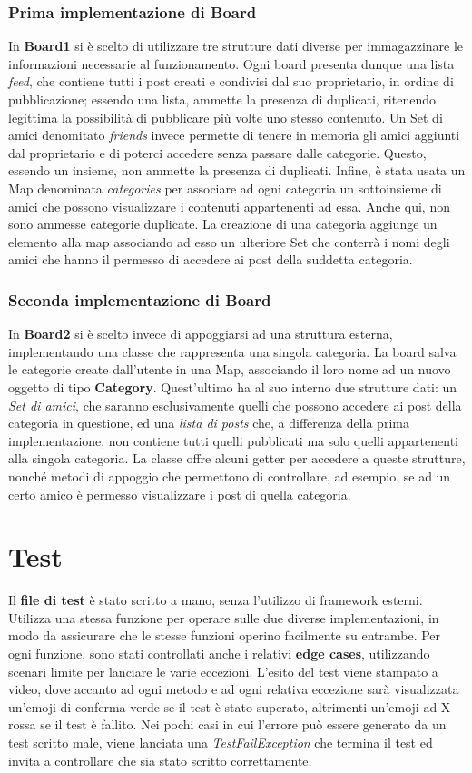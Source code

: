\documentclass[10pt, italian, openany]{book}
\begin{document}
\subsubsection{Prima implementazione di Board}
In \textbf{Board1} si è scelto di utilizzare tre strutture dati diverse per immagazzinare le informazioni necessarie al funzionamento.
Ogni board presenta dunque una lista \textit{feed}, che contiene tutti i post creati e condivisi dal suo proprietario, in ordine di pubblicazione; essendo una lista, ammette la presenza di duplicati, ritenendo legittima la possibilità di pubblicare più volte uno stesso contenuto. Un Set di amici denomitato \textit{friends} invece permette di tenere in memoria gli amici aggiunti dal proprietario e di poterci accedere senza passare dalle categorie. Questo, essendo un insieme, non ammette la presenza di duplicati. Infine, è stata usata un Map denominata \textit{categories} per associare ad ogni categoria un sottoinsieme di amici che possono visualizzare i contenuti appartenenti ad essa. Anche qui, non sono ammesse categorie duplicate. La creazione di una categoria aggiunge un elemento alla map associando ad esso un ulteriore Set che conterrà i nomi degli amici che hanno il permesso di accedere ai post della suddetta categoria.

\subsubsection{Seconda implementazione di Board}
In \textbf{Board2} si è scelto invece di appoggiarsi ad una struttura esterna, implementando una classe che rappresenta una singola categoria. La board salva le categorie create dall'utente in una Map, associando il loro nome ad un nuovo oggetto di tipo \textbf{Category}. Quest'ultimo ha al suo interno due strutture dati: un \textit{Set di amici}, che saranno esclusivamente quelli che possono accedere ai post della categoria in questione, ed una \textit{lista di posts} che, a differenza della prima implementazione, non contiene tutti quelli pubblicati ma solo quelli appartenenti alla singola categoria. La classe offre alcuni getter per accedere a queste strutture, nonché metodi di appoggio che permettono di controllare, ad esempio, se ad un certo amico è permesso visualizzare i post di quella categoria.

\section{Test}
Il \textbf{file di test} è stato scritto a mano, senza l'utilizzo di framework esterni. Utilizza una stessa funzione per operare sulle due diverse implementazioni, in modo da assicurare che le stesse funzioni operino facilmente su entrambe. Per ogni funzione, sono stati controllati anche i relativi \textbf{edge cases}, utilizzando scenari limite per lanciare le varie eccezioni. L'esito del test viene stampato a video, dove accanto ad ogni metodo e ad ogni relativa eccezione sarà visualizzata un'emoji di conferma verde se il test è stato superato, altrimenti un'emoji ad X rossa se il test è fallito. Nei pochi casi in cui l'errore può essere generato da un test scritto male, viene lanciata una \textit{TestFailException} che termina il test ed invita a controllare che sia stato scritto correttamente.
\end{document}
